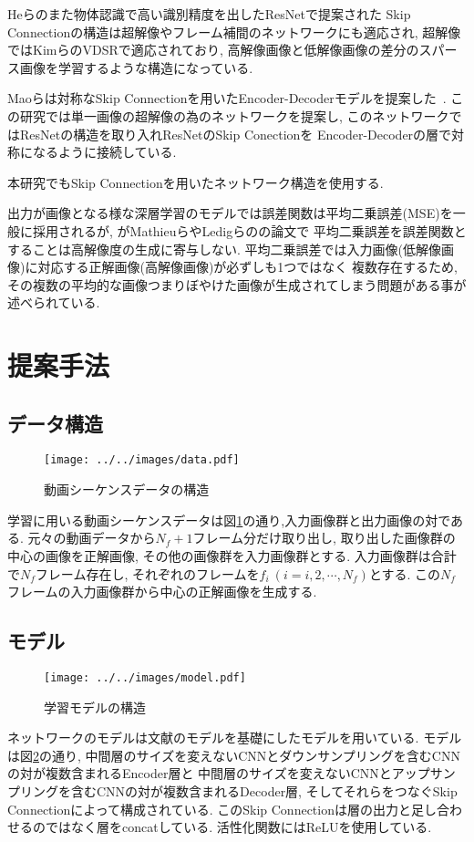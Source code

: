 \documentclass[twocolumn,a4j,uplatex]{jsarticle}
\begin{document}
Heらのまた物体認識で高い識別精度を出したResNet\cite{He_2016_CVPR}で提案された
Skip Connectionの構造は超解像やフレーム補間のネットワークにも適応され,
超解像ではKimらのVDSR\cite{Kim_2016_CVPR}で適応されており,
高解像画像と低解像画像の差分のスパース画像を学習するような構造になっている.

Maoらは対称なSkip Connectionを用いたEncoder-Decoderモデルを提案した~\cite{DBLP:conf/nips/2016}.
この研究では単一画像の超解像の為のネットワークを提案し,
このネットワークではResNet\cite{He_2016_CVPR}の構造を取り入れResNetのSkip Conectionを
Encoder-Decoderの層で対称になるように接続している.

本研究でもSkip Connectionを用いたネットワーク構造を使用する.

出力が画像となる様な深層学習のモデルでは誤差関数は平均二乗誤差(MSE)を一般に採用されるが,
がMathieuら\cite{1511.05440}やLedigらの\cite{Ledig2016arxiv}の論文で
平均二乗誤差を誤差関数とすることは高解像度の生成に寄与しない.
平均二乗誤差では入力画像(低解像画像)に対応する正解画像(高解像画像)が必ずしも1つではなく
複数存在するため, その複数の平均的な画像つまりぼやけた画像が生成されてしまう問題がある事が述べられている.
\section{提案手法}
\subsection{データ構造}
\begin{figure}[htbp]
    \centering
    \texttt{[image: ../../images/data.pdf]}
    \caption{動画シーケンスデータの構造}
    \label{fig:dataset}
\end{figure}

学習に用いる動画シーケンスデータは図\ref{fig:dataset}の通り,入力画像群と出力画像の対である.
元々の動画データから$N_f + 1$フレーム分だけ取り出し,
取り出した画像群の中心の画像を正解画像, その他の画像群を入力画像群とする.
入力画像群は合計で$N_f$フレーム存在し, それぞれのフレームを$f_i~(i = i,  2, \cdots , N_f)$とする.
この$N_f$フレームの入力画像群から中心の正解画像を生成する.
\subsection{モデル}
\begin{figure}[htbp]
    \centering
    \texttt{[image: ../../images/model.pdf]}
    \caption{学習モデルの構造}
    \label{fig:model}
\end{figure}
ネットワークのモデルは文献\cite{DBLP:conf/nips/2016}のモデルを基礎にしたモデルを用いている.
モデルは図\ref{fig:model}の通り, 中間層のサイズを変えないCNNとダウンサンプリングを含むCNNの対が複数含まれるEncoder層と
中間層のサイズを変えないCNNとアップサンプリングを含むCNNの対が複数含まれるDecoder層,
そしてそれらをつなぐSkip Connectionによって構成されている.
このSkip Connectionは層の出力と足し合わせるのではなく層をconcatしている.
活性化関数にはReLUを使用している.
\end{document}
